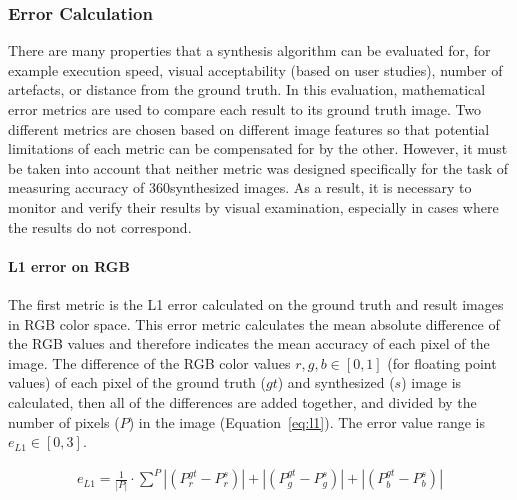 \subsubsection{Error Calculation}
There are many properties that a synthesis algorithm can be evaluated for, for example execution speed, visual acceptability (based on user studies), number of artefacts, or distance from the ground truth. In this evaluation, mathematical
error metrics are used to compare each result to its ground truth image.  Two different metrics are chosen based on different image features so that potential limitations of each metric can be compensated for by the other. However, it must be taken into account that neither metric was designed specifically for the task of measuring accuracy of 360\degree synthesized images. As a result, it is necessary to monitor and verify their results by visual examination, especially in cases where the results do not correspond.

\paragraph{L1 error on RGB}
The first metric is the L1 error calculated on the ground truth and result images in RGB color space. This error metric calculates the mean absolute difference of the RGB values and therefore indicates the mean accuracy of each pixel of the image. 
The difference of the RGB color values $r,g,b \in [0,1]$ (for floating point values) of each pixel of the ground truth ($gt$) and synthesized ($s$) image is calculated, then all of the differences are added together, and divided by the number of pixels ($P$) in the image (Equation~\ref{eq:l1}). The error value range is $e_{L1} \in [0,3]$.

\begin{align}
  e_{L1} = \frac{1}{|P|} \cdot \sum_{}^{P} |(P_r^{gt} - P_r^{s})| + |(P_g^{gt} - P_g^{s})| + |(P_b^{gt} - P_b^{s})|   \label{eq:l1}
\end{align}


